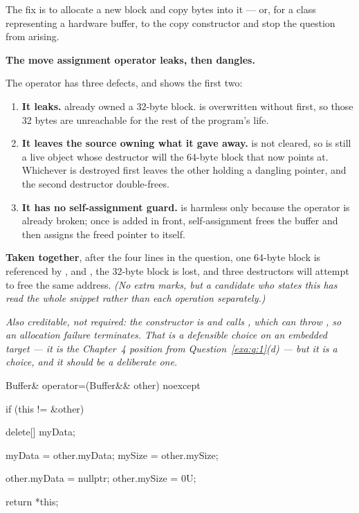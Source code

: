 The fix is to allocate a new block and copy  bytes into it --- or, for a class
representing a hardware buffer, to  the copy constructor and stop the question from
arising.

\textbf{The move assignment operator leaks, then dangles.} 

The operator has three defects, and  shows the first two:
\begin{enumerate}
  \item \textbf{It leaks.}  already owned a 32-byte block.  is overwritten
    without  first, so those 32 bytes are unreachable for the rest of the program's
    life.
  \item \textbf{It leaves the source owning what it gave away.}  is not cleared,
    so  is still a live object whose destructor will  the 64-byte block that
     now points at. Whichever is destroyed first leaves the other holding a dangling
    pointer, and the second destructor double-frees.
  \item \textbf{It has no self-assignment guard.}  is harmless only because
    the operator is already broken; once  is added in front, self-assignment
    frees the buffer and then assigns the freed pointer to itself.
\end{enumerate}

\textbf{Taken together}, after the four lines in the question, one 64-byte block is referenced by
,  and , the 32-byte block is lost, and three destructors will attempt to
free the same address. \textit{(No extra marks, but a candidate who states this has read the whole
snippet rather than each operation separately.)}

\textit{Also creditable, not required: the constructor is  and calls ,
which can throw , so an allocation failure terminates. That is a defensible
choice on an embedded target --- it is the Chapter~4 position from Question~\ref{exa:q:1}(d) --- but
it is a choice, and it should be a deliberate one.}

\begin{cppcode}
Buffer& operator=(Buffer&& other) noexcept
{
    if (this != &other)
    {
        delete[] myData;

        myData = other.myData;
        mySize = other.mySize;

        other.myData = nullptr;
        other.mySize = 0U;
    }
    return *this;
}
\end{cppcode}

